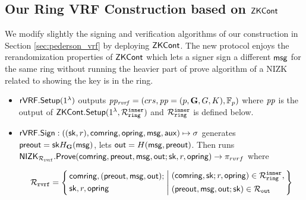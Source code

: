 
\subsection{Our Ring VRF Construction based on $ {\mathsf{ZKCont}} $}

\label{subsec:rvrf_faster}
We modify slightly the signing and verification algorithms of our construction in Section \ref{sec:pederson_vrf} by deploying $ {\mathsf{ZKCont}} $. 
The new protocol enjoys the rerandomization properties of $ {\mathsf{ZKCont}} $ which lets a signer sign a 
different $ \mathsf{msg} $ for the same ring without running the  heavier part of prove algorithm of a NIZK related to showing the key is in the ring.  
\begin{itemize}
	\item $ {\mathsf{rVRF}}.{\mathsf{Setup}}(1^\lambda)   $ outputs $ \mathit{pp_{\mathit{rvrf}}} = (crs, \mathit{pp} = (p, {\mathbf{G}},G, K), \mathbb{F}_p) $ where $ \mathit{pp} $ is the output of $ {\mathsf{ZKCont}}.{\mathsf{Setup}}(1^\lambda, \mathcal{R}_{\mathtt{ring}}^{\mathtt{inner}}) $ and $\mathcal{R}_{\mathtt{ring}}^{\mathtt{inner}}$ is defined below.
	\item ${\mathsf{rVRF}}.{\mathsf{Sign}} : ((\mathsf{sk},r),\mathsf{comring}, \mathsf{opring},\mathsf{msg},\mathsf{aux}) \mapsto \sigma$ generates $ {\mathsf{preout}} = \mathsf{sk} H_{\mathbf{G}}(\mathsf{msg}) $, lets $ {\mathsf{out}} = H(\mathsf{msg}, {\mathsf{preout}}) $. Then runs $ {\mathsf{NIZK}}_{\mathcal{R}_{\mathtt{rvrf}}}.{\mathsf{Prove}}(\mathsf{comring},{\mathsf{preout}}, \mathsf{msg}, {\mathsf{out}}; \mathsf{sk},r,\mathsf{opring})\rightarrow \pi_{rvrf}$ where
	
{\begin{scriptsize}
		$$ \relrvrf = \Setst{
			\begin{aligned}
				&\comring, (\PreOut,\msg, \Out); \\
				&\sk,r, \openring
			\end{aligned}
		}{
			\begin{aligned}
				& (\comring,\sk;r,\openring) \in \relinner, \\
				& (\PreOut, \msg, \Out; \sk) \in \relout
		\end{aligned}	}$$
	\end{scriptsize}
}   
	

\end{itemize}
